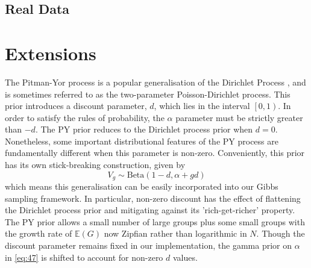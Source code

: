 \documentclass[a4paper,12pt,fleqn]{article}
\numberwithin{equation}{section}
\begin{document}
\subsection[Real Data]{Real Data}

\section[Extensions]{Extensions}
The Pitman-Yor process is a popular generalisation of the Dirichlet Process \citet{Perman1992}, and is sometimes referred to as the two-parameter Poisson-Dirichlet process. This prior introduces a discount parameter, $d$, which lies in the interval $\left[0, 1\right)$. In order to satisfy the rules of probability, the $\alpha$ parameter must be strictly greater than $-d$. The PY prior reduces to the Dirichlet process prior when $d=0$. Nonetheless, some important distributional features of the PY process are fundamentally different when this parameter is non-zero. Conveniently, this prior has its own stick-breaking construction, given by
\begin{equation}
V_g \sim \textrm{Beta}\left(1 - d, \alpha + gd\right)\label{eq:48}
\end{equation}
which means this generalisation can be easily incorporated into our Gibbs sampling framework. In particular, non-zero discount has the effect of flattening the Dirichlet process prior and mitigating against its 'rich-get-richer' property. The PY prior allows a small number of large groups plus some small groups with the growth rate of $\mathbb{E}\left(G\right)$ now Zipfian rather than logarithmic in $N$. Though the discount parameter remains fixed in our implementation, the gamma prior on $\alpha$ in \eqref{eq:47} is shifted to account for non-zero $d$ values. \newline
\end{document}
